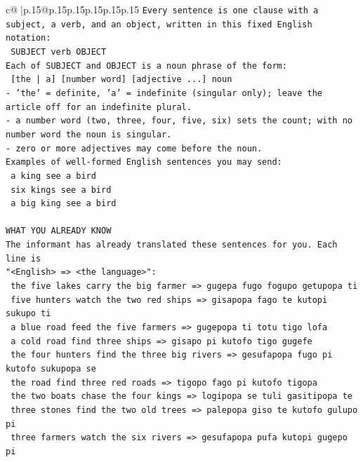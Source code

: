 \documentclass{article}
\begin{document}
{\begin{supertabular}{c@{$\;$}|p{.15\linewidth}@{}p{.15\linewidth}p{.15\linewidth}p{.15\linewidth}p{.15\linewidth}p{.15\linewidth}}
{{{\texttt{Every sentence is one clause with a subject, a verb, and an object, written in this fixed English notation:} \\
\texttt{    SUBJECT  verb  OBJECT} \\
\texttt{Each of SUBJECT and OBJECT is a noun phrase of the form:} \\
\texttt{    {[}the | a{]}  {[}number word{]}  {[}adjective ...{]}  noun} \\
\texttt{{-} 'the' = definite, 'a' = indefinite (singular only); leave the article off for an indefinite plural.} \\
\texttt{{-} a number word (two, three, four, five, six) sets the count; with no number word the noun is singular.} \\
\texttt{{-} zero or more adjectives may come before the noun.} \\
\texttt{Examples of well{-}formed English sentences you may send:} \\
\texttt{    a king see a bird} \\
\texttt{    six kings see a bird} \\
\texttt{    a big king see a bird} \\
\\ 
\texttt{WHAT YOU ALREADY KNOW} \\
\texttt{The informant has already translated these sentences for you. Each line is} \\
\texttt{"<English>  =>  <the language>":} \\
\texttt{    the five lakes carry the big farmer  =>  gugepa fugo fogupo getupopa ti} \\
\texttt{    five hunters watch the two red ships  =>  gisapopa fago te kutopi sukupo ti} \\
\texttt{    a blue road feed the five farmers  =>  gugepopa ti totu tigo lofa} \\
\texttt{    a cold road find three ships  =>  gisapo pi kutofo tigo gugefe} \\
\texttt{    the four hunters find the three big rivers  =>  gesufapopa fugo pi kutofo sukupopa se} \\
\texttt{    the road find three red roads  =>  tigopo fago pi kutofo tigopa} \\
\texttt{    the two boats chase the four kings  =>  logipopa se tuli gasitipopa te} \\
\texttt{    three stones find the two old trees  =>  palepopa giso te kutofo gulupo pi} \\
\texttt{    three farmers watch the six rivers  =>  gesufapopa pufa kutopi gugepo pi} \\
}}}
\end{supertabular}}
\end{document}
